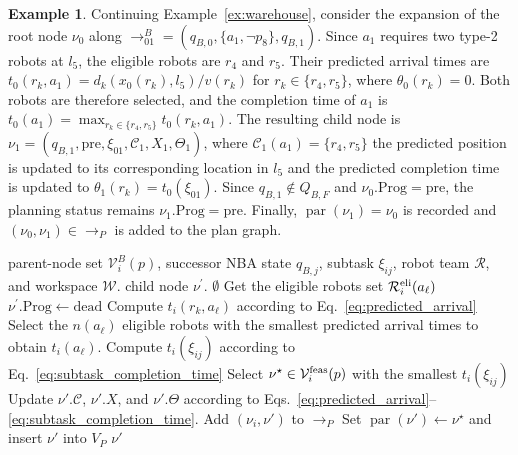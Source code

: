 \documentclass[lettersize,journal]{IEEEtran}
\theoremstyle{italiclemma}
\theoremstyle{italiclemma}
\theoremstyle{definition}
\newtheorem{example}{Example}
\begin{document}
\begin{example}\label{ex:plan_node_extension}
Continuing Example~\ref{ex:warehouse}, consider the expansion of the root node $\nu_0$ along $\rightarrow^B_{01} = (q_{B,0},\{a_1,\neg p_8\},q_{B,1})$. Since $a_1$ requires two type-2 robots at $l_5$, the eligible robots are $r_4$ and $r_5$. Their predicted arrival times are $t_0(r_k,a_1)=d_k(x_0(r_k),l_5)/v(r_k)$ for
$r_k\in\{r_4,r_5\}$, where $\theta_0(r_k)=0$. Both robots are therefore selected, and the completion time of $a_1$ is
$t_0(a_1)=\max_{r_k\in\{r_4,r_5\}}t_0(r_k,a_1)$.  The resulting child node is $\nu_1=(q_{B,1},\mathrm{pre},\xi_{01},\mathcal C_1,X_1,\Theta_1)$, where $\mathcal C_1(a_1)=\{r_4,r_5\}$ the predicted position is updated to its corresponding location in $l_5$ and the predicted completion time is updated to $\theta_1(r_k)=t_0(\xi_{01})$. Since $q_{B,1}\notin Q_{B,F}$ and $\nu_0.\mathrm{Prog}=\mathrm{pre}$, the planning status remains $\nu_1.\mathrm{Prog}=\mathrm{pre}$. Finally, $\operatorname{par}(\nu_1)=\nu_0$ is recorded and $(\nu_0,\nu_1)\in\rightarrow_P$ is added to the plan graph.
\end{example}

\begin{algorithm}[H]
\caption{\textsc{Extend\_PlanGraph}}
\label{alg:extend_successor}
\begin{algorithmic}[1]
\REQUIRE parent-node set $\mathcal V_i^B(p)$, successor NBA state $q_{B,j}$, subtask $\xi_{ij}$, robot team $\mathcal R$, and workspace $\mathcal W$.
\ENSURE child node $\nu^{'}$.
    \RETURN $\emptyset$
\ENDIF
{}
        \STATE Get the eligible robots set $\mathcal R_i^{\rm eli}(a_\ell)$
            \STATE $\nu^{'}.\mathrm{Prog}\gets\mathrm{dead}$
            \STATE {}
        \ENDIF
        \STATE Compute $t_i(r_k,a_\ell)$  according to
        Eq.~\eqref{eq:predicted_arrival}
        \STATE Select the $n(a_\ell)$ eligible robots with the smallest predicted arrival times to obtain $t_i(a_\ell)$.
    \ENDFOR
    \STATE Compute $t_i(\xi_{ij})$ according to
        Eq.~\eqref{eq:subtask_completion_time}
\ENDFOR
    \STATE Select $\nu^\star\in\mathcal V_i^{\rm feas}(p)$ with the smallest $t_i(\xi_{ij})$
    \STATE Update $\nu'.\mathcal C$, $\nu'.X$, and $\nu'.\Theta$ according to Eqs.~\eqref{eq:predicted_arrival}--\eqref{eq:subtask_completion_time}.
    \STATE Add $(\nu_i,\nu')$ to $\rightarrow_P$
    \ENDFOR
    \STATE Set $\operatorname{par}(\nu')\gets\nu^\star$
and insert $\nu'$ into $V_P$
    \RETURN $\nu'$
\end{algorithmic}
\end{algorithm}
\end{document}
